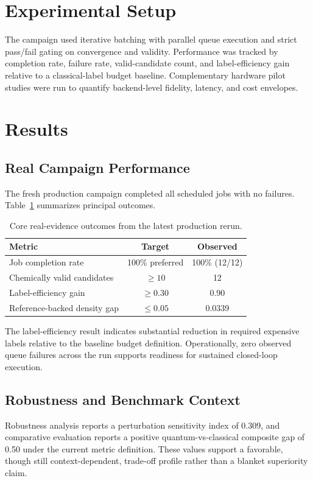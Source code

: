 \documentclass[11pt]{article}
\begin{document}
\section{Experimental Setup}
The campaign used iterative batching with parallel queue execution and strict pass/fail gating on convergence and validity. Performance was tracked by completion rate, failure rate, valid-candidate count, and label-efficiency gain relative to a classical-label budget baseline. Complementary hardware pilot studies were run to quantify backend-level fidelity, latency, and cost envelopes.

\section{Results}
\subsection{Real Campaign Performance}
The fresh production campaign completed all scheduled jobs with no failures. Table~\ref{tab:core-metrics} summarizes principal outcomes.

\begin{table}[h]
\centering
\begin{tabular}{@{}lcc@{}}
\toprule
Metric & Target & Observed \\
\midrule
Job completion rate & 100\% preferred & 100\% (12/12) \\
Chemically valid candidates & $\geq 10$ & 12 \\
Label-efficiency gain & $\geq 0.30$ & 0.90 \\
Reference-backed density gap & $\leq 0.05$ & 0.0339 \\
\bottomrule
\end{tabular}
\caption{Core real-evidence outcomes from the latest production rerun.}
\label{tab:core-metrics}
\end{table}

The label-efficiency result indicates substantial reduction in required expensive labels relative to the baseline budget definition. Operationally, zero observed queue failures across the run supports readiness for sustained closed-loop execution.

\subsection{Robustness and Benchmark Context}
Robustness analysis reports a perturbation sensitivity index of 0.309, and comparative evaluation reports a positive quantum-vs-classical composite gap of 0.50 under the current metric definition. These values support a favorable, though still context-dependent, trade-off profile rather than a blanket superiority claim.
\end{document}
